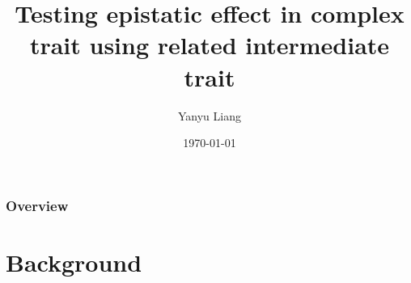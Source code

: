 \documentclass{beamer}
\title{Testing epistatic effect in complex trait using related intermediate trait} %
\author{Yanyu Liang}
\institute[U of C]
{
University of Chicago \\
\medskip
\textit{yanyul@uchicago.edu} %
}
\date{\today} %
\begin{document}
\begin{frame}
\titlepage %
\end{frame}
\begin{frame}
\frametitle{Overview} %
\tableofcontents %
\end{frame}


\section{Background}
\end{document}
